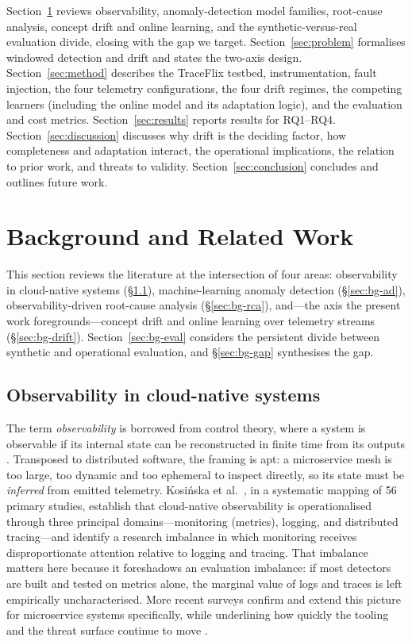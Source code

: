 \documentclass[acmsmall]{acmart}
\begin{document}
Section~\ref{sec:background} reviews observability, anomaly-detection model families, root-cause analysis, concept drift and online learning, and the synthetic-versus-real evaluation divide, closing with the gap we target. Section~\ref{sec:problem} formalises windowed detection and drift and states the two-axis design. Section~\ref{sec:method} describes the TraceFlix testbed, instrumentation, fault injection, the four telemetry configurations, the four drift regimes, the competing learners (including the online model and its adaptation logic), and the evaluation and cost metrics. Section~\ref{sec:results} reports results for RQ1--RQ4. Section~\ref{sec:discussion} discusses why drift is the deciding factor, how completeness and adaptation interact, the operational implications, the relation to prior work, and threats to validity. Section~\ref{sec:conclusion} concludes and outlines future work.

\section{Background and Related Work}\label{sec:background}

This section reviews the literature at the intersection of four areas: observability in cloud-native systems (\S\ref{sec:bg-obs}), machine-learning anomaly detection (\S\ref{sec:bg-ad}), observability-driven root-cause analysis (\S\ref{sec:bg-rca}), and---the axis the present work foregrounds---concept drift and online learning over telemetry streams (\S\ref{sec:bg-drift}). Section~\ref{sec:bg-eval} considers the persistent divide between synthetic and operational evaluation, and \S\ref{sec:bg-gap} synthesises the gap.

\subsection{Observability in cloud-native systems}\label{sec:bg-obs}

The term \emph{observability} is borrowed from control theory, where a system is observable if its internal state can be reconstructed in finite time from its outputs \cite{kosinska2023}. Transposed to distributed software, the framing is apt: a microservice mesh is too large, too dynamic and too ephemeral to inspect directly, so its state must be \emph{inferred} from emitted telemetry. Kosi\'nska et al.\ \cite{kosinska2023}, in a systematic mapping of 56 primary studies, establish that cloud-native observability is operationalised through three principal domains---monitoring (metrics), logging, and distributed tracing---and identify a research imbalance in which monitoring receives disproportionate attention relative to logging and tracing. That imbalance matters here because it foreshadows an evaluation imbalance: if most detectors are built and tested on metrics alone, the marginal value of logs and traces is left empirically uncharacterised. More recent surveys confirm and extend this picture for microservice systems specifically, while underlining how quickly the tooling and the threat surface continue to move \cite{faseeha2025observability}.
\end{document}
